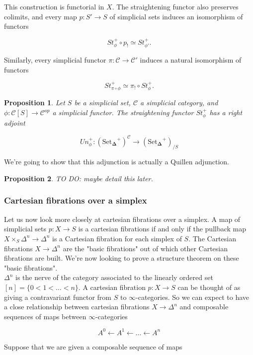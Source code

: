 \documentclass[12pt]{amsart}
\newcommand{\8}{\ensuremath{\infty}}
\newcommand{\C}{\ensuremath{\mathscr{C}}}
\newcommand{\SSet}{\ensuremath{\text{Set}_{\boldsymbol{\Delta}}}}
\newtheorem{proposition}{Proposition}
\begin{document}
This construction is functorial in $X$. The straightening functor also preserves colimits, and every map $p:S'\rightarrow S$ of simplicial sets induces an isomorphism of functors

$$
  St_\phi^+\circ p_! \simeq St^+_{\phi'}.
$$

Similarly, every simplicial functor $\pi:\C\rightarrow \C'$ induces a natural isomorphism of functors

$$
  St^+_{\pi\circ\phi} \simeq \pi_!\circ St^+_\phi.
$$

\begin{proposition}
  Let $S$ be a simplicial set, $\C$ a simplicial category, and $\phi:\mathscr{C}[S]\rightarrow \C^{op}$ a simplicial functor. The straightening functor $St^+_\phi$ has a right adjoint

  $$
    Un_\phi^+:(\SSet^+)^\C\rightarrow (\SSet^+)_{/S}
  $$
\end{proposition}

We're going to show that this adjunction is actually a Quillen adjunction.

\begin{proposition}
  TO DO: maybe detail this later.
\end{proposition}

\subsubsection{Cartesian fibrations over a simplex}
Let us now look more closely at cartesian fibrations over a simplex. A map of simplicial sets $p:X\rightarrow S$ is a cartesian fibrations if and only if the pullback map $X\times_S \Delta^n \rightarrow \Delta^n$ is a Cartesian fibration for each simplex of $S$. The Cartesian fibrations $X\rightarrow \Delta^n$ are the "basic fibrations" out of which other Cartesian fibrations are built. We're now looking to prove a structure theorem on these "basic fibrations".\\
$\Delta^n$ is the nerve of the category associated to the linearly ordered set $[n] = \{0<1<\dots <n\}.$ A cartesian fibration $p:X\rightarrow S$ can be thought of as giving a contravariant functor from $S$ to $\8$-categories. So we can expect to have a close relationship between cartesian fibrations $X\rightarrow \Delta^n$ and composable sequences of maps between \8-categories

$$
  A^0\leftarrow A^1\leftarrow \dots \leftarrow A^n
$$

Suppose that we are given a composable sequence of maps
\end{document}
